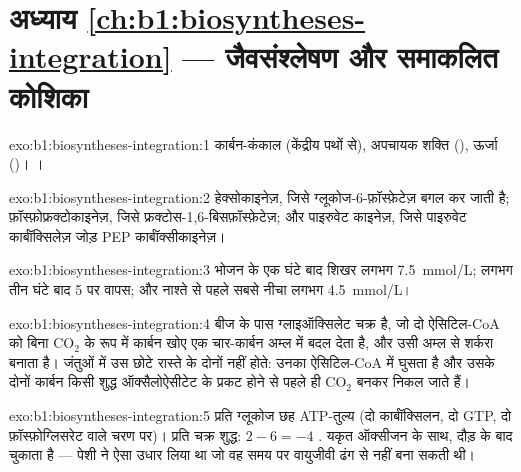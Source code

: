 \section*{अध्याय \ref{ch:b1:biosyntheses-integration} --- जैवसंश्लेषण और समाकलित कोशिका}

\begin{solution}{exo:b1:biosyntheses-integration:1}
कार्बन-कंकाल (केंद्रीय पथों से), अपचायक शक्ति (),
ऊर्जा ()। ।
\end{solution}

\begin{solution}{exo:b1:biosyntheses-integration:2}
हेक्सोकाइनेज़, जिसे ग्लूकोज-6-फ़ॉस्फ़ेटेज़ बगल कर जाती है;
फ़ॉस्फ़ोफ्रक्टोकाइनेज़, जिसे फ्रक्टोस-1,6-बिसफ़ॉस्फ़ेटेज़; और पाइरुवेट
काइनेज़, जिसे पाइरुवेट कार्बॉक्सिलेज़ जोड़ PEP कार्बॉक्सीकाइनेज़।
\end{solution}

\begin{solution}{exo:b1:biosyntheses-integration:3}
भोजन के एक घंटे बाद शिखर लगभग \qty{7.5}{mmol/L}; लगभग तीन घंटे बाद
\qty{5}{} पर वापस; और नाश्ते से पहले सबसे नीचा लगभग \qty{4.5}{mmol/L}।
\end{solution}

\begin{solution}{exo:b1:biosyntheses-integration:4}
बीज के पास ग्लाइऑक्सिलेट चक्र है, जो दो ऐसिटिल-CoA को बिना
$\mathrm{CO_2}$ के रूप में कार्बन खोए एक चार-कार्बन अम्ल में बदल देता है,
और उसी अम्ल से शर्करा बनाता है। जंतुओं में उस छोटे रास्ते के दोनों 
नहीं होते: उनका ऐसिटिल-CoA  में घुसता है और उसके दोनों कार्बन
किसी शुद्ध ऑक्सैलोऐसीटेट के प्रकट होने से पहले ही $\mathrm{CO_2}$ बनकर निकल जाते हैं।
\end{solution}

\begin{solution}{exo:b1:biosyntheses-integration:5}
प्रति ग्लूकोज छह ATP-तुल्य (दो कार्बॉक्सिलन, दो GTP, दो 
फ़ॉस्फ़ोग्लिसरेट वाले चरण पर)। प्रति चक्र शुद्ध: $2 - 6 = -4$ .
यकृत ऑक्सीजन के साथ, दौड़ के बाद चुकाता है --- पेशी ने ऐसा
 उधार लिया था जो वह समय पर वायुजीवी ढंग से नहीं बना सकती थी।
\end{solution}

